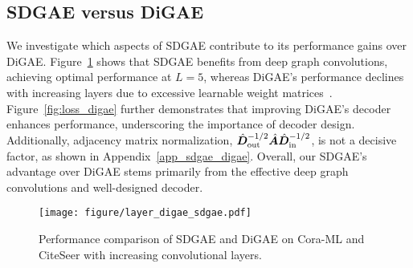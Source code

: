\subsection{SDGAE versus DiGAE}
We investigate which aspects of SDGAE contribute to its performance gains over DiGAE. Figure~\ref{fig:layer_sdage} shows that SDGAE benefits from deep graph convolutions, achieving optimal performance at \(L=5\), whereas DiGAE's performance declines with increasing layers due to excessive learnable weight matrices~\cite{pengover}. Figure~\ref{fig:loss_digae} further demonstrates that improving DiGAE's decoder enhances performance, underscoring the importance of decoder design. Additionally, adjacency matrix normalization, $\hat{{\bm{D}}}_{\rm out}^{-1/2}\hat{{\bm{A}}}\hat{{\bm{D}}}_{\rm in}^{-1/2}$, is not a decisive factor, as shown in Appendix~\ref{app_sdgae_digae}. Overall, our SDGAE's advantage over DiGAE stems primarily from the  effective deep graph convolutions and well-designed decoder.




\begin{figure}[t]
    \centering
   \vspace{-2.5mm}
   \texttt{[image: figure/layer\_digae\_sdgae.pdf]}
   \vspace{-8mm}
   \caption{Performance comparison of SDGAE and DiGAE on Cora-ML and CiteSeer with increasing convolutional layers.}
   \vspace{-1.5mm}
    \label{fig:layer_sdage}
 \end{figure}

